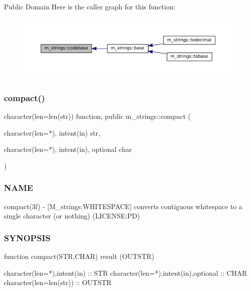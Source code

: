 Public Domain Here is the caller graph for this function\+:\nopagebreak
\begin{figure}[H]
\begin{center}
\leavevmode
\includegraphics[width=350pt]{namespacem__strings_a3a022b64dc902dc6043e3f265ee78e38_icgraph}
\end{center}
\end{figure}
\mbox{\label{namespacem__strings_a929c032267cb990ad4991fab4aed1d57}} 
\subsubsection{\texorpdfstring{compact()}{compact()}}
{\footnotesize\ttfamily character(len=len(str)) function, public m\+\_\+strings\+::compact (\begin{DoxyParamCaption}\item[{character(len=$\ast$), intent(in)}]{str,  }\item[{character(len=$\ast$), intent(in), optional}]{char }\end{DoxyParamCaption})}



\subsubsection*{N\+A\+ME}

compact(3f) -\/ \mbox{[}M\+\_\+strings\+:W\+H\+I\+T\+E\+S\+P\+A\+CE\mbox{]} converts contiguous whitespace to a single character (or nothing) (L\+I\+C\+E\+N\+SE\+:PD) 

\subsubsection*{S\+Y\+N\+O\+P\+S\+IS}

\begin{DoxyVerb}function compact(STR,CHAR) result (OUTSTR)

 character(len=*),intent(in)          :: STR
 character(len=*),intent(in),optional :: CHAR
 character(len=len(str))              :: OUTSTR
\end{DoxyVerb}
